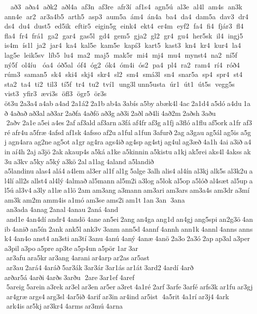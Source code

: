 \  að3  aða4  aðk2  aðl4a  af3n  af3re  afr3í  af1s4  agn5ú  al3e  al4l  am4s  an3k  ann4e  ar2  ar3a4b5  arth5  asp3  aum5a  ám4  án4a  ba4  da4  dam5a  dav3  dr4  ds4  du4  dust5  ed5ik  eftir5  eigin5g  eink4  ekt4  er4m  eyf2  fa4  fi4  fjár3  fl4  fla4  fr4  frá1  ga2  gar4  gas5l  gd4  gem5  gja2  gl2  gr4  gu4  her5sk  il4  ingj5  is4m  ís1l  ja2  jar4  ka4  kal5e  kam5e  kapí3  kart5  kast3  kn4  kr4  kur4  la4  lag5e  leik5sv  líb5  lu4  ma2  maj5  mak5r  mi4  mj4  mu4  mynst4  na2  ní5f  ný5f  ol4íu   óa4  óð5al  óf4  óg2  ók4  óm4i  ós2  pa4  pl4  ra2  ram4  rí4  róð4  rúm3  saman5  sk4  ski4  skj4  skr4  sl2  sm4  smá3l  sn4  snar5a  sp4  spr4  st4  sta2  ta4  ti2  til3  tí5f  tr4  tu2  tví1  ung3l 	 unn5usta  úr1  út1  út5s  vegg5s  vist3  yfir3  ævi3s  öfl3  ögr5  ör3s  öt3u 2a3a4 a4ab a4ad 2a1á2 2a1b ab4a 3abís a5by abæk4l 4ac 2a1d4 a5dó a4du 1að 4aðað að3al að3ar 2aðfa 4aðfö að3g að3i 2aðl að4li 4að2m 2aðsh 3aðu  2aðv 2a1e a5ei a4es 2af af3ald af3arn a3fá af4fr af3g a1fj a3fló a1flu af5ork a1fr af3ré afr4u a5fræ 4afsd af1sk 4afsso af2u a1ful a1fun 3afurð 2ag a3gau ag5ál ag5is a5gj agn4ara ag2ne ag5ot a1gr ag4ra ags4ið ag4sp ag4stj ag4ul ag3æð 4a1h 4ai a3ið a4in aí4h 2aj a3jö 2ak akaup4s a5ká a1ke a5kinnin a5kistu a1kj ak5rei aks4l 4akss ak3u a3kv a5ky a5ký a3kö 2al a1lag 4aland 	a5landið 	a5landinu alas4 alá4 a4lem al3er al1f al1g 5alge 3alh alis4 al4ín al3kj alk5s al3k2u al4lí all2s allst4 al4lý 4almað al5mann al5m2i a3log a5lok al5op a5lóð al4sæt al5up al5ú al3v4 a3ly a1læ a1lö 2am am3ang a3mann am3ari am3ars am3a4s am3dr a3mí am3k am2m amm4is a1mó am3se ams2i am1t 1an 3an  3ana  an3ada 4anag 2anal 4anau 2aná 4and  and1e 4an4dí andr4 4andö 4ane an5ei 2ang an4ga ang1d an4gj ang5spi an2g3ö 4anib 4anið an5ín 2ank ank5l ank3v 3anm ann5d 4annf 4annh ann1k 4annl 4anns annsk4 4an4o anst4 an3sti an3tí 3anu 4anú 4aný 4anæ 4anö 2a3o 2a3ó 2ap ap3al a3per a3pil a3po a5pre ap3te a5p4un a5pör 1ar 3ar  ar3afu ara5kr ar3ang 4arani ar4arp ar2as ar5ast  ar3au 2ará4 4aráð 5ar3ák 3ar3ár 3ar1ás ar1át 3ard2 4ardí 4arð  	arðar5á 4arði 4arðs 3arðu  2are 3ar1ef 4aref  5areig 5arein a3rek ar3el ar3en ar5er a3ret 4a1ré 2arf 3arfe 3arfé arfs3k ar1fu ar3gj ar4græ args4 arg3sl 4ar5ið 4arif ar3in ar4ind ar5ist  4a5rit 4a1rí ar3j4 4ark  ark4is ar5kj ar3kr4 4arms ar3mú 4arna 